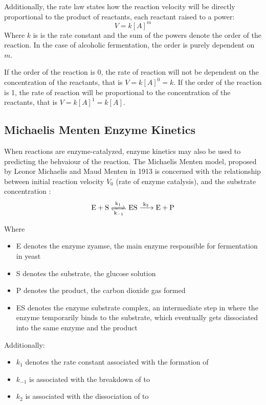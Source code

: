 \documentclass{article}
\begin{document}
Additionally, the rate law states how the reaction velocity will be directly proportional to the product of reactants, each reactant raised to a power:
\begin{equation}
    V = k[A]^m
\end{equation}
Where $k$ is is the rate constant and the sum of the powers denote the order of the reaction. In the case of alcoholic fermentation, the order is purely dependent on $m$.

\medskip

If the order of the reaction is 0, the rate of reaction will not be dependent on the concentration of the reactants, that is $V = k[A]^0 = k$. If the order of the reaction is 1, the rate of reaction will be proportional to the concentration of the reactants, that is $V = k[A]^1 = k[A]$.

\subsection{Michaelis Menten Enzyme Kinetics}
When reactions are enzyme-catalyzed, enzyme kinetics may also be used to predicting the behvaiour of the reaction. The Michaelis Menten model, proposed by Leonor Michaelis and Maud Menten in 1913 is concerned with the relationship between initial reaction velocity $V_0$ (rate of enzyme catalysis), and the substrate concentration \parencite{biochem}:
\begin{equation}
    \ce{E + S <=>[k_1][k_{-1}] ES ->[k_2] E + P}
\end{equation}

Where
\begin{itemize}[topsep=\parskip, noitemsep]
    \item E denotes the enzyme zyamse, the main enzyme responsible for fermentation in yeast
    \item S denotes the substrate, the glucose solution
    \item P denotes the product, the carbon dioxide gas formed
    \item ES denotes the enzyme substrate complex, an intermediate step in where the enzyme temporarily binds to the substrate, which eventually gets dissociated into the same enzyme and the product
\end{itemize}

\medskip

Additionally:
\begin{itemize}[topsep=\parskip, noitemsep]
    \item $k_1$ denotes the rate constant associated with the formation of 
    \item $k_{-1}$ is associated with the breakdown of  to 
    \item $k_2$ is associated with the dissociation of  to 
\end{itemize}
\end{document}
